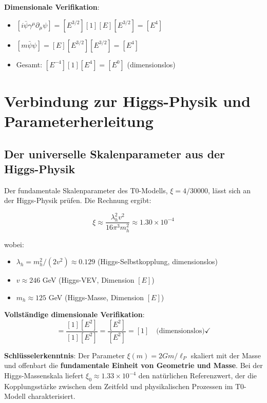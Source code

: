 	\textbf{Dimensionale Verifikation}:
	\begin{itemize}
		\item $[i\bar{\psi}\gamma^\mu\partial_\mu\psi] = [E^{3/2}][1][E][E^{3/2}] = [E^4]$
		\item $[m\bar{\psi}\psi] = [E][E^{3/2}][E^{3/2}] = [E^4]$
		\item Gesamt: $[E^{-4}][1][E^4] = [E^0]$ (dimensionslos) \checkmark
	\end{itemize}
	
	\section{Verbindung zur Higgs-Physik und Parameterherleitung}
	\label{sec:higgs_parameter_verbindung}
	
	\subsection{Der universelle Skalenparameter aus der Higgs-Physik}
	\label{subsec:universeller_skalenparameter}
	
	Der fundamentale Skalenparameter des T0-Modells, $\xi = 4/30000$, lässt sich an der Higgs-Physik prüfen. Die Rechnung ergibt:
	
	\begin{equation}
		\boxed{\xi \approx \frac{\lambda_h^2 v^2}{16\pi^3 m_h^2} \approx 1.30 \times 10^{-4}}
		\label{eq:xi_higgs_universal}
	\end{equation}
	
	wobei:
	\begin{itemize}
		\item $\lambda_h = m_h^2/(2v^2) \approx 0.129$ (Higgs-Selbstkopplung, dimensionslos)
		\item $v \approx 246$ GeV (Higgs-VEV, Dimension $[E]$)
		\item $m_h \approx 125$ GeV (Higgs-Masse, Dimension $[E]$)
	\end{itemize}
	
	\textbf{Vollständige dimensionale Verifikation}:
	\begin{equation}
		[\xi] = \frac{[1][E^2]}{[1][E^2]} = \frac{[E^2]}{[E^2]} = [1] \quad \text{(dimensionslos)} \checkmark
	\end{equation}
	
\begin{tcolorbox}[colback=green!5!white,colframe=green!75!black,title=Universeller Skalenparameter]
	\textbf{Schlüsselerkenntnis}: Der Parameter $\xi(m) = 2Gm/\ell_P$ skaliert mit der Masse und offenbart die \textbf{fundamentale Einheit von Geometrie und Masse}. Bei der Higgs-Massenskala liefert $\xi_0 \approx 1.33 \times 10^{-4}$ den natürlichen Referenzwert, der die Kopplungsstärke zwischen dem Zeitfeld und physikalischen Prozessen im T0-Modell charakterisiert.
\end{tcolorbox}
	
